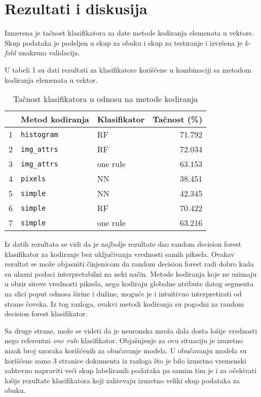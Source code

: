 \documentclass[]{amsart}
\begin{document}
\section{Rezultati i diskusija}
\label{sec:orga78d38e}


Izmerena je tačnost klasifikatora za date metode kodiranja elemenata u vektore. Skup podataka je podeljen u skup za obuku i skup za testiranje
i izvršena je \textit{k-fold} unakrsna validacija. 

U tabeli 1 su dati rezultati za klasifikatore korišćene u kombinaciji sa metodom kodiranja elemenata u vektor.


\begin{table}
\begin{tabular}{rllr}
 & Metod kodiranja & Klasifikator & Tačnost (\%)\\
\hline
1 & \texttt{histogram} & RF & 71.792\\
2 & \texttt{img\_attrs} & RF & 72.034\\
3 & \texttt{img\_attrs} & one rule & 63.153\\
4 & \texttt{pixels} & NN & 38.451\\
5 & \texttt{simple} & NN & 42.345\\
6 & \texttt{simple} & RF & 70.422\\
7 & \texttt{simple} & one rule & 63.216\\
\end{tabular}
\caption{Tačnost klasifikatora u odnosu na metode kodiranja}
\end{table}

Iz datih rezultata se vidi da je najbolje rezultate dao random decision forest klasifikator za kodiranje bez uključivanja vrednosti samih piksela. Ovakav
rezultat se može objasniti činjenicom da random decision forest radi dobro kada su ulazni podaci interpretabilni na neki način. 
Metode kodiranja koje ne uzimaju u obzir sirove vrednosti piksela, nego kodiraju globalne atribute datog segmenta
na slici poput odnosa širine i dužine, moguće je i intuitivno interpretirati od strane čoveka. Iz tog razloga, ovakvi metodi kodiranja su pogodni za random decision forest klasifikator.


Sa druge strane, može se videti da je neuronska mreža dala dosta lošije vrednosti nego referentni \textit{one rule} klasifikator. Objašnjenje za ovu situaciju je
izuzetno nizak broj uzoraka korišćenih za obučavanje modela. U obučavanju modela su korišćene samo 3 stranice dokumenta iz razloga što je bilo izuzetno vremenski
zahtevno  napraviti veći skup labeliranih podataka pa samim tim je i za očekivati lošije rezultate klasifikatora koji zahtevaju izuzetno veliki skup podataka
za obuku.
\end{document}
